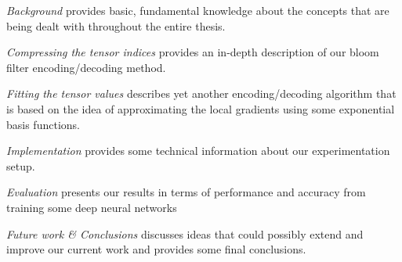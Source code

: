         \textit{Background} provides basic, fundamental knowledge about the concepts that are being dealt with throughout the entire thesis.
    
        \textit{Compressing the tensor indices} provides an in-depth description of our bloom filter
        encoding/decoding method.

        \textit{Fitting the tensor values} describes yet another encoding/decoding algorithm that is based on the idea of approximating the local gradients using some exponential basis functions.
        
        \textit{Implementation} provides some technical information about our experimentation setup.
        
        \textit{Evaluation} presents our results in terms of performance and accuracy from 
        training some deep neural networks 

        \textit{Future work \& Conclusions} discusses ideas that could possibly extend and improve our current work and provides some final conclusions.
